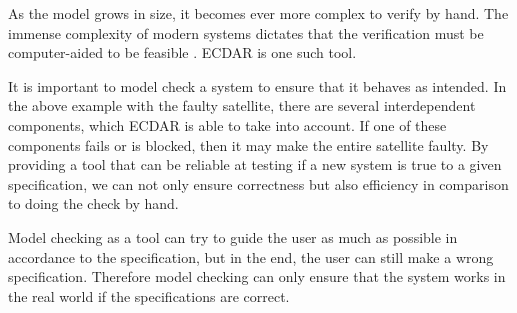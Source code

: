 As the model grows in size, it becomes ever more complex to verify by hand.
The immense complexity of modern systems dictates that the verification must be computer-aided to be feasible \cite{modelchecking-handbook}. ECDAR is one such tool.

It is important to model check a system to ensure that it behaves as intended.
In the above example with the faulty satellite, there are several interdependent components, which ECDAR is able to take into account.
If one of these components fails or is blocked, then it may make the entire satellite faulty.
By providing a tool that can be reliable at testing if a new system is true to a given specification, we can not only ensure correctness but also efficiency in comparison to doing the check by hand.

Model checking as a tool can try to guide the user as much as possible in accordance to the specification, but in the end, the user can still make a wrong specification. Therefore model checking can only ensure that the system works in the real world if the specifications are correct.